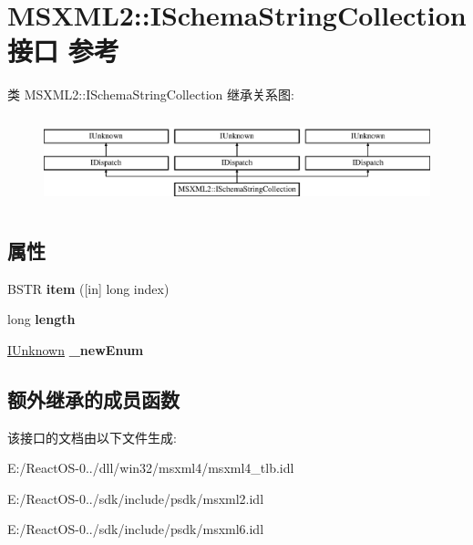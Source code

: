 \hypertarget{interface_m_s_x_m_l2_1_1_i_schema_string_collection}{}\section{M\+S\+X\+M\+L2\+:\+:I\+Schema\+String\+Collection接口 参考}
\label{interface_m_s_x_m_l2_1_1_i_schema_string_collection}
类 M\+S\+X\+M\+L2\+:\+:I\+Schema\+String\+Collection 继承关系图\+:\begin{figure}[H]
\begin{center}
\leavevmode
\includegraphics[height=2.592592cm]{interface_m_s_x_m_l2_1_1_i_schema_string_collection}
\end{center}
\end{figure}
\subsection*{属性}
\begin{DoxyCompactItemize}
\item 
\mbox{\label{interface_m_s_x_m_l2_1_1_i_schema_string_collection_a2bff4a4d1055e6f285e2ec4c6badbc42}} 
B\+S\+TR {\bfseries item} (\mbox{[}in\mbox{]} long index)
\item 
\mbox{\label{interface_m_s_x_m_l2_1_1_i_schema_string_collection_a62d87a6aa329a04ac220ae036c340e77}} 
long {\bfseries length}
\item 
\mbox{\label{interface_m_s_x_m_l2_1_1_i_schema_string_collection_a6fb6ce65b11a8fc6164d0e97d94e3e91}} 
\hyperlink{interface_i_unknown}{I\+Unknown} {\bfseries \+\_\+new\+Enum}
\end{DoxyCompactItemize}
\subsection*{额外继承的成员函数}


该接口的文档由以下文件生成\+:\begin{DoxyCompactItemize}
\item 
E\+:/\+React\+O\+S-\/0../dll/win32/msxml4/msxml4\+\_\+tlb.\+idl\item 
E\+:/\+React\+O\+S-\/0../sdk/include/psdk/msxml2.\+idl\item 
E\+:/\+React\+O\+S-\/0../sdk/include/psdk/msxml6.\+idl\end{DoxyCompactItemize}
